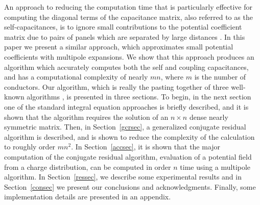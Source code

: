 An approach to reducing the computation time that is particularly
effective for computing the diagonal terms of the capacitance matrix,
also referred to as the self-capacitances, is to ignore small contributions
to the potential coefficient matrix due to pairs of panels which are separated
by large distances \cite{dew}.
In this paper we present a similar approach, which approximates
small potential coefficients with multipole expansions.
We show that this approach produces an algorithm which accurately computes
both the self and coupling capacitances, and has a computational
complexity of nearly $ mn $, where $ m $ is the number of
conductors.  Our algorithm, which is really the pasting together of
three well-known algorithms  \cite{roh}, is presented in three
sections.  To begin, in the next section one of the standard integral
equation approaches is briefly described, and it is shown that the
algorithm requires the solution of an $ n\times n $ dense nearly
symmetric matrix.  Then, in Section~\ref{gcrsec}, a generalized
conjugate residual algorithm is described, and is shown to reduce
the complexity of the calculation to roughly order $ m n^2 $.  In
Section~\ref{accsec}, it is shown that the major computation of the
conjugate residual algorithm, evaluation of a potential field from a
charge distribution, can be computed in order $ n $ time using a
multipole algorithm.  In Section~\ref{ressec}, we describe some experimental
results and in Section~\ref{consec} we present our conclusions and
acknowledgments. Finally,
some implementation details are presented in an appendix.


